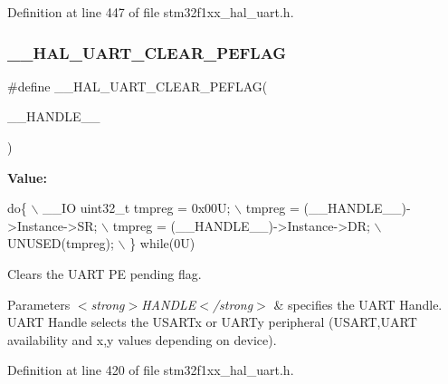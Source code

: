 Definition at line 447 of file stm32f1xx\+\_\+hal\+\_\+uart.\+h.

\mbox{\label{group___u_a_r_t___exported___macros_gaba5e19c60e0f37341b1585a380b84d49}} 
\subsubsection{\texorpdfstring{\+\_\+\+\_\+\+H\+A\+L\+\_\+\+U\+A\+R\+T\+\_\+\+C\+L\+E\+A\+R\+\_\+\+P\+E\+F\+L\+AG}{\_\_HAL\_UART\_CLEAR\_PEFLAG}}
{\footnotesize\ttfamily \#define \+\_\+\+\_\+\+H\+A\+L\+\_\+\+U\+A\+R\+T\+\_\+\+C\+L\+E\+A\+R\+\_\+\+P\+E\+F\+L\+AG(\begin{DoxyParamCaption}\item[{}]{\+\_\+\+\_\+\+H\+A\+N\+D\+L\+E\+\_\+\+\_\+ }\end{DoxyParamCaption})}

{\bfseries Value\+:}
\begin{DoxyCode}
\textcolor{keywordflow}{do}\{                                           \(\backslash\)
    \_\_IO uint32\_t tmpreg = 0x00U;               \(\backslash\)
    tmpreg = (\_\_HANDLE\_\_)->Instance->SR;        \(\backslash\)
    tmpreg = (\_\_HANDLE\_\_)->Instance->DR;        \(\backslash\)
    UNUSED(tmpreg);                             \(\backslash\)
  \} \textcolor{keywordflow}{while}(0U)
\end{DoxyCode}


Clears the U\+A\+RT PE pending flag. 


\begin{DoxyParams}{Parameters}
{\em $<$strong$>$\+H\+A\+N\+D\+L\+E$<$/strong$>$} & specifies the U\+A\+RT Handle. U\+A\+RT Handle selects the U\+S\+A\+R\+Tx or U\+A\+R\+Ty peripheral (U\+S\+A\+RT,U\+A\+RT availability and x,y values depending on device). \\
\hline
\end{DoxyParams}


Definition at line 420 of file stm32f1xx\+\_\+hal\+\_\+uart.\+h.

